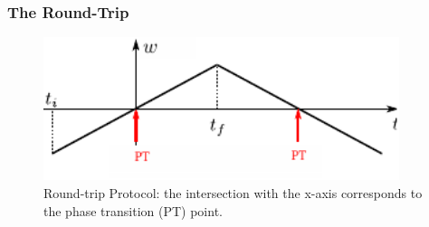 \begin{frame}
	\frametitle{The Round-Trip}

	\begin{center}
		\begin{figure}
					   \includegraphics[width=10.4cm]{paper/protocol.pdf}
					  \caption{ Round-trip Protocol: the intersection with the x-axis corresponds to the phase transition (PT) point.  }
					\label{protocol}
		\end{figure}
	\end{center}
	
	
	
\end{frame}